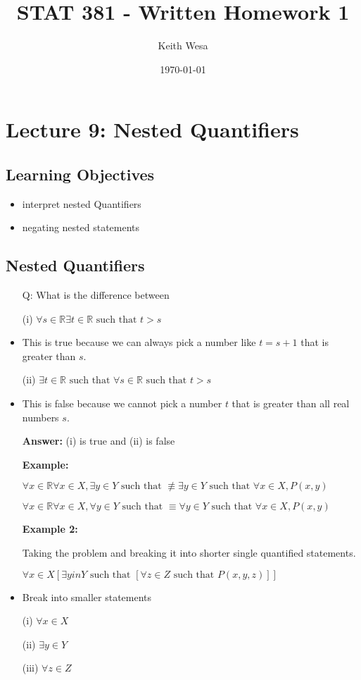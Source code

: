 \documentclass{article}
\author{Keith Wesa}
\title{STAT 381 - Written Homework 1}
\date{\today}
\begin{document}
\section*{Lecture 9: Nested Quantifiers}
\subsection*{Learning Objectives}
\begin{itemize}
    \item interpret nested Quantifiers
    \item negating nested statements 
\end{itemize}
\subsection*{Nested Quantifiers}
\begin{itemize}
    \item[Q:] What is the difference between
    \item[(i)] $\forall s \in \mathbb{R} \exists t \in \mathbb{R} \text{ such that } t > s$
    \item This is true because we can always pick a number like $t = s + 1$ that is greater than $s$.
    \item[(ii)] $\exists t \in \mathbb{R} \text{ such that } \forall s \in \mathbb{R} \text{ such that } t > s$
    \item This is false because we cannot pick a number $t$ that is greater than all real numbers $s$.
    \item[] \textbf{Answer:} (i) is true and (ii) is false
    \item[] \textbf{Example:}
    \item[] $\forall x \in \mathbb{R} \forall x \in X, \exists y \in Y \text{ such that } \not \equiv \exists y \in Y \text{ such that } \forall x \in X, P(x,y)$ 
    \item[] $\forall x \in \mathbb{R} \forall x \in X, \forall y \in Y \text{ such that } \equiv \forall y \in Y \text{ such that } \forall x \in X, P(x,y)$
    \item[] \textbf{Example 2:}
    \item[] Taking the problem and breaking it into shorter single quantified statements.
    \item[] $\forall x \in X[\exists y in Y \text{ such that } [\forall z \in Z \text{ such that } P(x,y,z)]]$
    \item Break into smaller statements
    \item[(i)] $\forall x \in X$
    \item[(ii)] $\exists y \in Y$
    \item[(iii)] $\forall z \in Z$
\end{itemize}
\end{document}
